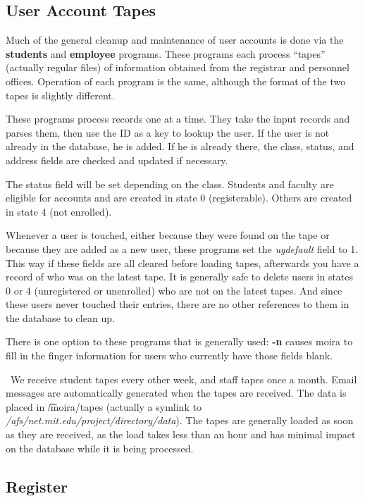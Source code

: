 \documentclass{book}
\begin{document}
\subsection{User Account Tapes}

Much of the general cleanup and maintenance of user accounts is done
via the {\bf students} and {\bf employee} programs.  These programs
each process ``tapes'' (actually regular files) of information
obtained from the registrar and personnel offices.  Operation of each
program is the same, although the format of the two tapes is slightly
different.

These programs process records one at a time.  They take the input
records and parses them, then use the ID as a key to lookup the user.
If the user is not already in the database, he is added.  If he is
already there, the class, status, and address fields are checked and
updated if necessary.

The status field will be set depending on the class.  Students and
faculty are eligible for accounts and are created in state 0
(registerable).  Others are created in state 4 (not enrolled).

Whenever a user is touched, either because they were found on the tape
or because they are added as a new user, these programs set the
{\em ugdefault} field to 1.  This way if these fields are all cleared
before loading tapes, afterwards you have a record of who was on the
latest tape.  It is generally safe to delete users in states 0 or 4
(unregistered or unenrolled) who are not on the latest tapes.  And
since these users never touched their entries, there are no other
references to them in the database to clean up.

There is one option to these programs that is generally used:
{\bf -n} causes moira to fill in the finger information for users who
currently have those fields blank.

\athena\ We receive student tapes every other week, and staff tapes
once a month.  Email messages are automatically generated when the
tapes are received.  The data is placed in {\t /moira/tapes} (actually
a symlink to {\it /afs/net.mit.edu/project/directory/data}).  The
tapes are generally loaded as soon as they are received, as the load
takes less than an hour and has minimal impact on the database while
it is being processed.

\subsection{Register}
\end{document}
